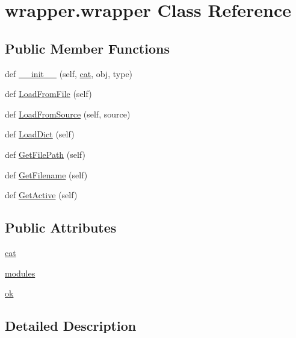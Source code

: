\hypertarget{classwrapper_1_1wrapper}{}\section{wrapper.\+wrapper Class Reference}
\label{classwrapper_1_1wrapper}
\subsection*{Public Member Functions}
\begin{DoxyCompactItemize}
\item 
def \hyperlink{classwrapper_1_1wrapper_a0709d1d42877783bb4f7d84adc34b1ad}{\+\_\+\+\_\+init\+\_\+\+\_\+} (self, \hyperlink{classwrapper_1_1wrapper_ab0c2277e5f957e77c3502085b5629c2c}{cat}, obj, type)
\item 
def \hyperlink{classwrapper_1_1wrapper_a0ae8c1f5e175d8ea7d43223dc880aba6}{Load\+From\+File} (self)
\item 
def \hyperlink{classwrapper_1_1wrapper_aee2ada5ae65c88654d560ee4c9f23dbb}{Load\+From\+Source} (self, source)
\item 
def \hyperlink{classwrapper_1_1wrapper_a5d047ef93e1fb3cdf75b4fb8266a0a8a}{Load\+Dict} (self)
\item 
def \hyperlink{classwrapper_1_1wrapper_a3c92a3d23586ea94e280359554b05baf}{Get\+File\+Path} (self)
\item 
def \hyperlink{classwrapper_1_1wrapper_a38e355694400434e5759ad0a70e4d1bc}{Get\+Filename} (self)
\item 
def \hyperlink{classwrapper_1_1wrapper_a97ff384380baa3e200f92f20bf48fffa}{Get\+Active} (self)
\end{DoxyCompactItemize}
\subsection*{Public Attributes}
\begin{DoxyCompactItemize}
\item 
\hyperlink{classwrapper_1_1wrapper_ab0c2277e5f957e77c3502085b5629c2c}{cat}
\item 
\hyperlink{classwrapper_1_1wrapper_a59acff5098966e96d4ab251cde101735}{modules}
\item 
\hyperlink{classwrapper_1_1wrapper_a81f1d31a0ccc51bfdf4d8e18eff6e437}{ok}
\end{DoxyCompactItemize}


\subsection{Detailed Description}


